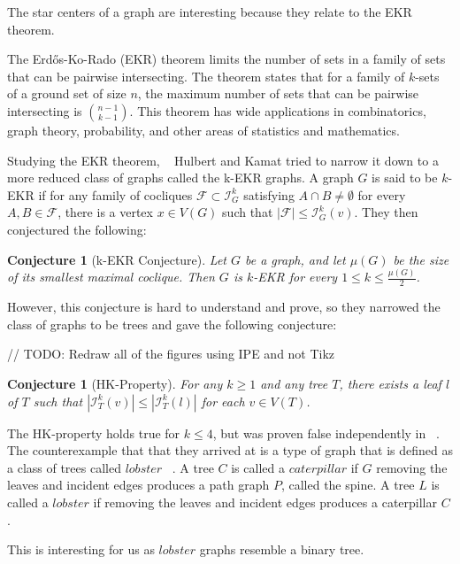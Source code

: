 \documentclass{amsart}
\newtheorem{conjecture}[theorem]{Conjecture}
\theoremstyle{definition}
\begin{document}
The star centers of a graph are interesting because they relate to the EKR theorem.

The Erd\H{o}s-Ko-Rado (EKR) theorem limits the number of sets in a family of sets that can be pairwise intersecting. The theorem states that for a family of $k$-sets of a ground set of size $n$, the maximum number of sets that can be pairwise intersecting is $\binom{n-1}{k-1}$. This theorem has wide applications in combinatorics, graph theory, probability, and other areas of statistics and mathematics.

Studying the EKR theorem, ~\cite{MR2763040} Hulbert and Kamat tried to narrow it down to a more reduced class of graphs called the k-EKR graphs. A graph $G$ is said to be $k$-EKR if for any family of cocliques $\mathcal{F} \subset \mathcal{I}^k_G$ satisfying $A \cap B \neq \emptyset$ for every $A, B \in \mathcal{F}$, there is a vertex $x \in V(G)$ such that $|\mathcal{F}| \leq \mathcal{I}^k_G(v)$. They then conjectured the following:

\begin{conjecture}[k-EKR Conjecture]
	Let $G$ be a graph, and let $\mu(G)$ be the size of its smallest maximal coclique. Then $G$ is $k$-EKR for every $1 \leq k \leq \frac{\mu(G)}{2}$.
\end{conjecture}

\newpage

However, this conjecture is hard to understand and prove, so they narrowed the class of graphs to be trees and gave the following conjecture:

// TODO: Redraw all of the figures using IPE and not Tikz

\begin{conjecture}[HK-Property]
	For any $k \geq 1$ and any tree $T$, there exists a leaf $l$ of $T$ such that $|\mathcal{I}^k_T(v)| \leq |\mathcal{I}^k_T(l)|$ for each $v \in V(T)$.
\end{conjecture}

The HK-property holds true for $k \leq 4$, but was proven false independently in ~\cite{MR3271819, MR3612439, MR2523796}. The counterexample that that they arrived at is a type of graph that is defined as a class of trees called $lobster$ ~\cite{MR4245360}.
A tree $C$ is called a $caterpillar$ if $G$ removing the leaves and incident edges produces a path graph $P$, called the spine. A tree $L$ is called a $lobster$ if removing the leaves and incident edges produces a caterpillar $C$.

This is interesting for us as $lobster$ graphs resemble a binary tree.
\end{document}
